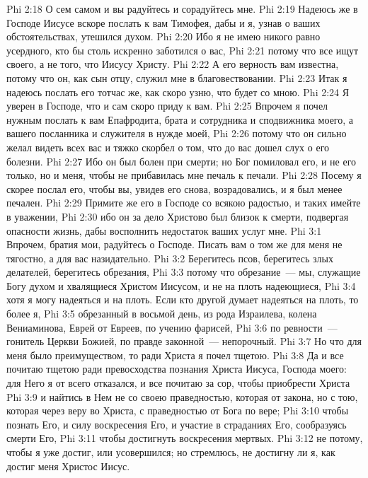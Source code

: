 \vs Phi 2:18 О сем самом и вы радуйтесь и сорадуйтесь мне.
\rsbpar\vs Phi 2:19 Надеюсь же в Господе Иисусе вскоре послать к вам Тимофея, дабы и я, узнав о ваших обстоятельствах, утешился духом.
\vs Phi 2:20 Ибо я не имею никого равно усердного, кто бы столь искренно заботился о вас,
\vs Phi 2:21 потому что все ищут своего, а не того, что  Иисусу Христу.
\vs Phi 2:22 А его верность вам известна, потому что он, как сын отцу, служил мне в благовествовании.
\vs Phi 2:23 Итак я надеюсь послать его тотчас же, как скоро узню, что будет со мною.
\vs Phi 2:24 Я уверен в Господе, что и сам скоро приду к вам.
\vs Phi 2:25 Впрочем я почел нужным послать к вам Епафродита, брата и сотрудника и сподвижника моего, а вашего посланника и служителя в нужде моей,
\vs Phi 2:26 потому что он сильно желал видеть всех вас и тяжко скорбел о том, что до вас дошел слух о его болезни.
\vs Phi 2:27 Ибо он был болен при смерти; но Бог помиловал его, и не его только, но и меня, чтобы не прибавилась мне печаль к печали.
\vs Phi 2:28 Посему я скорее послал его, чтобы вы, увидев его снова, возрадовались, и я был менее печален.
\vs Phi 2:29 Примите же его в Господе со всякою радостью, и таких имейте в уважении,
\vs Phi 2:30 ибо он за дело Христово был близок к смерти, подвергая опасности жизнь, дабы восполнить недостаток ваших услуг мне.
\vs Phi 3:1 Впрочем, братия мои, радуйтесь о Господе. Писать вам о том же для меня не тягостно, а для вас назидательно.
\rsbpar\vs Phi 3:2 Берегитесь псов, берегитесь злых делателей, берегитесь обрезания,
\vs Phi 3:3 потому что обрезание~--- мы, служащие Богу духом и хвалящиеся Христом Иисусом, и не на плоть надеющиеся,
\vs Phi 3:4 хотя я могу надеяться и на плоть. Если кто другой думает надеяться на плоть, то более я,
\vs Phi 3:5 обрезанный в восьмой день, из рода Израилева, колена Вениаминова, Еврей от Евреев, по учению фарисей,
\vs Phi 3:6 по ревности~--- гонитель Церкви Божией, по правде законной~--- непорочный.
\vs Phi 3:7 Но что для меня было преимуществом, то ради Христа я почел тщетою.
\vs Phi 3:8 Да и все почитаю тщетою ради превосходства познания Христа Иисуса, Господа моего: для Него я от всего отказался, и все почитаю за сор, чтобы приобрести Христа
\vs Phi 3:9 и найтись в Нем не со своею праведностью, которая от закона, но с тою, которая через веру во Христа, с праведностью от Бога по вере;
\vs Phi 3:10 чтобы познать Его, и силу воскресения Его, и участие в страданиях Его, сообразуясь смерти Его,
\vs Phi 3:11 чтобы достигнуть воскресения мертвых.
\vs Phi 3:12  не потому, чтобы я уже достиг, или усовершился; но стремлюсь, не достигну ли я, как достиг меня Христос Иисус.
